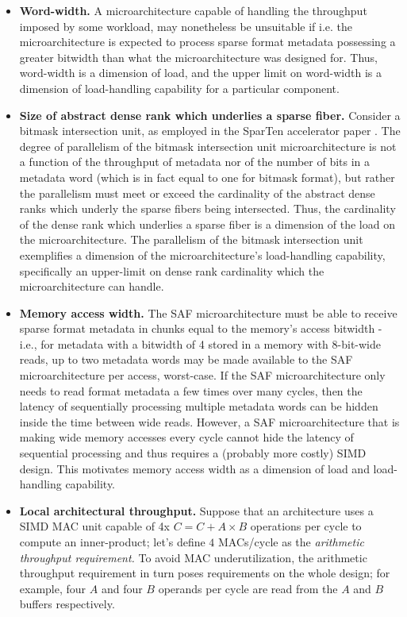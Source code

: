 \begin{itemize}
    \item \textbf{Word-width.} A microarchitecture capable of handling the throughput imposed by some workload, may nonetheless be unsuitable if i.e. the microarchitecture is expected to process sparse format metadata possessing a greater bitwidth than what the microarchitecture was designed for. Thus, word-width is a dimension of load, and the upper limit on word-width is a dimension of load-handling capability for a particular component.
    \item \textbf{Size of abstract dense rank which underlies a sparse fiber.} Consider a bitmask intersection unit, as employed in the SparTen accelerator paper \cite{sparten}. The degree of parallelism of the bitmask intersection unit microarchitecture is not a function of the throughput of metadata nor of the number of bits in a metadata word (which is in fact equal to one for bitmask format), but rather the parallelism must meet or exceed the cardinality of the abstract dense ranks which underly the sparse fibers being intersected. Thus, the cardinality of the dense rank which underlies a sparse fiber is a dimension of the load on the microarchitecture. The parallelism of the bitmask intersection unit exemplifies a dimension of the microarchitecture's load-handling capability, specifically an upper-limit on dense rank cardinality which the microarchitecture can handle.
    \item \textbf{Memory access width.} The SAF microarchitecture must be able to receive sparse format metadata in chunks equal to the memory's access bitwidth - i.e., for metadata with a bitwidth of 4 stored in a memory with 8-bit-wide reads, up to two metadata words may be made available to the SAF microarchitecture per access, worst-case. If the SAF microarchitecture only needs to read format metadata a few times over many cycles, then the latency of sequentially processing multiple metadata words can be hidden inside the time between wide reads. However, a SAF microarchitecture that is making wide memory accesses every cycle cannot hide the latency of sequential processing and thus requires a (probably more costly) SIMD design. This motivates memory access width as a dimension of load and load-handling capability.
    \item \textbf{Local architectural throughput.} Suppose that an architecture uses a SIMD MAC unit capable of 4x $C = C + A \times B$ operations per cycle to compute an inner-product; let's define $4$ MACs/cycle as the \textit{arithmetic throughput requirement.} To avoid MAC underutilization, the arithmetic throughput requirement in turn poses requirements on the whole design; for example, four $A$ and four $B$ operands per cycle are read from the $A$ and $B$ buffers respectively. 


\end{itemize}
